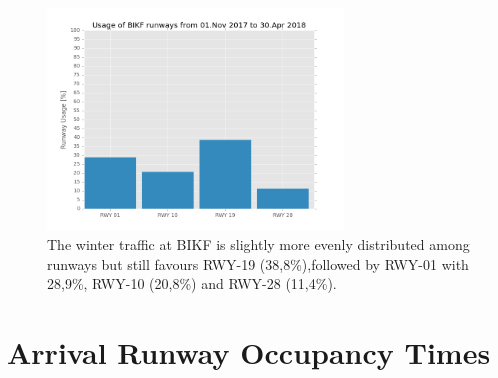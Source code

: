\begin{figure}[h]
    \centering
    \includegraphics[width=0.7\textwidth]{graphics/fig_runway_usage_winter}
    \caption[Winter runway usage at BIKF]{The winter traffic at BIKF is slightly more evenly distributed among runways but still favours RWY-19 (38,8\%),followed by RWY-01 with 28,9\%, RWY-10 (20,8\%) and RWY-28 (11,4\%).}
    \label{fig:runway_usage_winter}
\end{figure}

\clearpage
\chapter{Arrival Runway Occupancy Times\label{app:AROTs}}





\begin{table}[h]
\centering
{}
\caption[AROTs for the air traffic mix by runway for the summer]{AROT statistics for the air traffic mix at KEF by runway for the summer of 2018. The count is the number of landings during peak hours.}
\label{my-label3}
\end{table}

